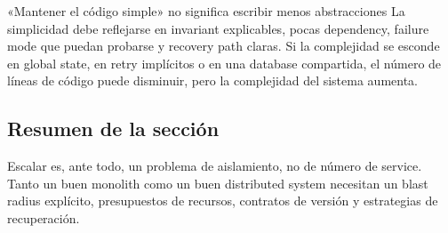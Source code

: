 \begin{warningbox}{«Mantener el código simple» no significa escribir menos abstracciones}
La simplicidad debe reflejarse en invariant explicables, pocas dependency, failure mode que puedan probarse y recovery path claras. Si la complejidad se esconde en global state, en retry implícitos o en una database compartida, el número de líneas de código puede disminuir, pero la complejidad del sistema aumenta.
\end{warningbox}


\subsection{Resumen de la sección}

Escalar es, ante todo, un problema de aislamiento, no de número de service. Tanto un buen monolith como un buen distributed system necesitan un blast radius explícito, presupuestos de recursos, contratos de versión y estrategias de recuperación.

